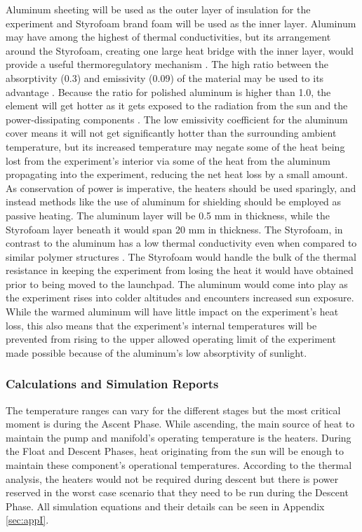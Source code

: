 Aluminum sheeting will be used as the outer layer of insulation for the experiment and Styrofoam brand foam will be used as the inner layer. Aluminum may have among the highest of thermal conductivities, but its arrangement around the Styrofoam, creating one large heat bridge with the inner layer, would provide a useful thermoregulatory mechanism \cite{EngTool}. The high ratio between the absorptivity (0.3) and emissivity (0.09) of the material may be used to its advantage \cite{EngTool}. Because the ratio for polished aluminum is higher than 1.0, the element will get hotter as it gets exposed to the radiation from the sun and the power-dissipating components \cite{RedRok}. The low emissivity coefficient for the aluminum cover means it will not get significantly hotter than the surrounding ambient temperature, but its increased temperature may negate some of the heat being lost from the experiment's interior via some of the heat from the aluminum propagating into the experiment, reducing the net heat loss by a small amount. As conservation of power is imperative, the heaters should be used sparingly, and instead methods like the use of aluminum for shielding should be employed as passive heating. The aluminum layer will be 0.5 mm in thickness, while the Styrofoam layer beneath it would span 20 mm in thickness. The Styrofoam, in contrast to the aluminum has a low thermal conductivity even when compared to similar polymer structures \cite{EngTool}. The Styrofoam would handle the bulk of the thermal resistance in keeping the experiment from losing the heat it would have obtained prior to being moved to the launchpad. The aluminum would come into play as the experiment rises into colder altitudes and encounters increased sun exposure. While the warmed aluminum will have little impact on the experiment's heat loss, this also means that the experiment's internal temperatures will be prevented from rising to the upper allowed operating limit of the experiment made possible because of the aluminum's low absorptivity of sunlight.


\subsubsection{Calculations and Simulation Reports}
\label{sec:4.6.5}

The temperature ranges can vary for the different stages but the most critical moment is during the Ascent Phase. While ascending, the main source of heat to maintain the pump and manifold's operating temperature is the heaters. During the Float and Descent Phases, heat originating from the sun will be enough to maintain these component's operational temperatures. According to the thermal analysis, the heaters would not be required during descent but there is power reserved in the worst case scenario that they need to be run during the Descent Phase.
All simulation equations and their details can be seen in Appendix \ref{sec:appI}. 

